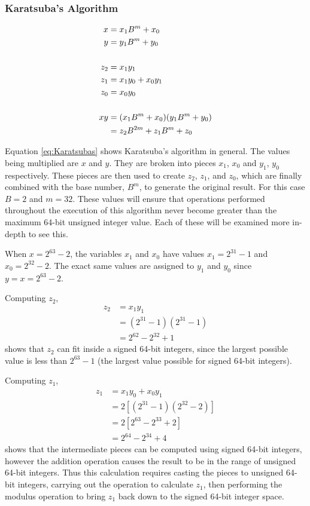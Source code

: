 \subsubsection{Karatsuba's Algorithm}
\begin{equation} \label{eq:Karatsubas}
\begin{split}
x &= x_1 B^m + x_0\\
y &= y_1 B^m + y_0 \cr\\
z_2 &= x_1 y_1\\
z_1 &= x_1 y_0 + x_0 y_1\\
z_0 &= x_0 y_0 \cr\\
xy & = (x_1 B^m + x_0)(y_1 B^m + y_0)\\
 & = z_2 B^{2m} + z_1 B^{m} + z_0
\end{split}
\end{equation}

Equation \ref{eq:Karatsubas} shows Karatsuba's algorithm in general. The values being multiplied are $x$ and $y$. They are broken into pieces $x_1$, $x_0$ and $y_1$, $y_0$ respectively. These pieces are then used to create $z_2$, $z_1$, and $z_0$, which are finally combined with the base number, $B^m$, to generate the original result. For this case $B=2$ and $m=32$. These values will ensure that operations performed throughout the execution of this algorithm never become greater than the maximum 64-bit unsigned integer value. Each of these will be examined more in-depth to see this.

When $x = 2^{63} - 2$, the variables $x_1$ and $x_0$ have values $x_1 = 2^{31} - 1$ and $x_0 = 2^{32} - 2$. The exact same values are assigned to $y_1$ and $y_0$ since $y = x = 2^{63} - 2$. 

Computing $z_2$,
\begin{equation}
\begin{split}
z_2 & = x_1 y_1\\
 & = (2^{31} - 1) (2^{31} - 1)\\
 & = 2^{62} - 2^{32} + 1
\end{split}
\end{equation}
shows that $z_2$ can fit inside a signed 64-bit integers, since the largest possible value is less than $2^{63} - 1$ (the largest value possible for signed 64-bit integers). 

Computing $z_1$,
\begin{equation}
\begin{split}
z_1 & = x_1 y_0 + x_0 y_1\\
 & = 2[(2^{31} - 1) (2^{32} - 2)]\\
 & = 2[2^{63} - 2^{33} + 2]\\
 & = 2^{64} - 2^{34} + 4
\end{split}
\end{equation}
shows that the intermediate pieces can be computed using signed 64-bit integers, however the addition operation causes the result to be in the range of unsigned 64-bit integers. Thus this calculation requires casting the pieces to unsigned 64-bit integers, carrying out the operation to calculate $z_1$, then performing the modulus operation to bring $z_1$ back down to the signed 64-bit integer space.

